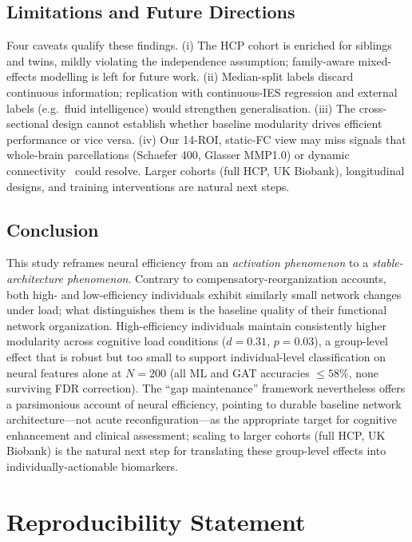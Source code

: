 \documentclass[conference]{IEEEtran}
\begin{document}
\subsection{Limitations and Future Directions}
\label{sec:limitations}

Four caveats qualify these findings. (i) The HCP cohort is enriched for siblings and twins, mildly violating the independence assumption; family-aware mixed-effects modelling is left for future work. (ii) Median-split labels discard continuous information; replication with continuous-IES regression and external labels (e.g.\ fluid intelligence) would strengthen generalisation. (iii) The cross-sectional design cannot establish whether baseline modularity drives efficient performance or vice versa. (iv) Our 14-ROI, static-FC view may miss signals that whole-brain parcellations (Schaefer 400, Glasser MMP1.0) or dynamic connectivity~\cite{shine2016dynamics} could resolve. Larger cohorts (full HCP, UK Biobank), longitudinal designs, and training interventions are natural next steps.

\subsection{Conclusion}

This study reframes neural efficiency from an \emph{activation phenomenon} to a \emph{stable-architecture phenomenon}. Contrary to compensatory-reorganization accounts, both high- and low-efficiency individuals exhibit similarly small network changes under load; what distinguishes them is the baseline quality of their functional network organization. High-efficiency individuals maintain consistently higher modularity across cognitive load conditions ($d=0.31$, $p=0.03$), a group-level effect that is robust but too small to support individual-level classification on neural features alone at $N=200$ (all ML and GAT accuracies $\leq 58\%$, none surviving FDR correction). The ``gap maintenance'' framework nevertheless offers a parsimonious account of neural efficiency, pointing to durable baseline network architecture---not acute reconfiguration---as the appropriate target for cognitive enhancement and clinical assessment; scaling to larger cohorts (full HCP, UK Biobank) is the natural next step for translating these group-level effects into individually-actionable biomarkers.

\section*{Reproducibility Statement}
\end{document}
